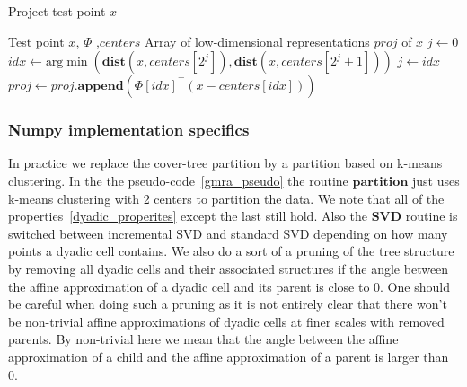 \documentclass{article}
\begin{document}
  \begin{algorithm}[tbh]
    \caption{Project test point $x$}
    \label{proj_point}
    \begin{algorithmic}
      \REQUIRE Test point $x$, $\Phi$ ,$centers$
      \ENSURE Array of low-dimensional representations $proj$ of $x$
      \STATE $j \leftarrow 0$
      \STATE $idx \leftarrow \text{arg}\min\left(\mathbf{dist}\left(x,centers[2^j]\right),\mathbf{dist}\left(x,centers[2^j+1]\right)\right)$
      \STATE $j \leftarrow idx$
      \STATE $proj \leftarrow proj.\mathbf{append}(\Phi[idx]^{\top}(x-centers[idx]))$
      \ENDWHILE
    \end{algorithmic}
  \end{algorithm}
  \subsubsection{Numpy implementation specifics}
  In practice we replace the cover-tree partition by a partition based on k-means clustering. In the the pseudo-code~\ref{gmra_pseudo} the routine $\mathbf{partition}$ just uses k-means clustering with 2 centers to partition the data. We note that all of the properties~\ref{dyadic_properites} except the last still hold. Also the $\mathbf{SVD}$ routine is switched between incremental SVD and standard SVD depending on how many points a dyadic cell contains. We also do a sort of a pruning of the tree structure by removing all dyadic cells and their associated structures if the angle between the affine approximation of a dyadic cell and its parent is close to 0. One should be careful when doing such a pruning as it is not entirely clear that there won't be non-trivial affine approximations of dyadic cells at finer scales with removed parents. By non-trivial here we mean that the angle between the affine approximation of a child and the affine approximation of a parent is larger than 0.
\end{document}
